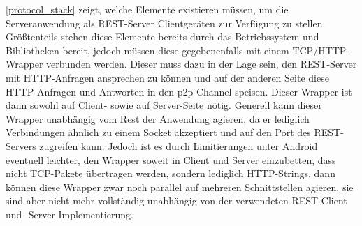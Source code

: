     \figurename \ref{protocol_stack} zeigt, welche Elemente existieren müssen, um die Serveranwendung als REST-Server Clientgeräten zur Verfügung zu stellen. Größtenteils stehen diese Elemente bereits durch das Betriebssystem und Bibliotheken bereit, jedoch müssen diese gegebenenfalls mit einem TCP/HTTP-Wrapper verbunden werden. Dieser muss dazu in der Lage sein, den REST-Server mit HTTP-Anfragen ansprechen zu können und auf der anderen Seite diese HTTP-Anfragen und Antworten in den p2p-Channel speisen. Dieser Wrapper ist dann sowohl auf Client- sowie auf Server-Seite nötig. Generell kann dieser Wrapper unabhängig vom Rest der Anwendung agieren, da er lediglich Verbindungen ähnlich zu einem Socket akzeptiert und auf den Port des REST-Servers zugreifen kann. Jedoch ist es durch Limitierungen unter Android eventuell leichter, den Wrapper soweit in Client und Server einzubetten, dass nicht TCP-Pakete übertragen werden, sondern lediglich HTTP-Strings, dann können diese Wrapper zwar noch parallel auf mehreren Schnittstellen agieren, sie sind aber nicht mehr vollständig unabhängig von der verwendeten REST-Client und -Server Implementierung.
